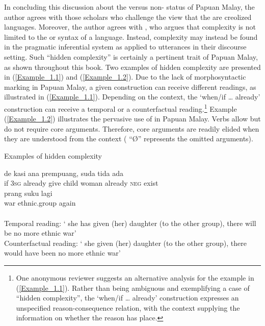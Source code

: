 In concluding this discussion about the  versus non- status of Papuan Malay, the author agrees with those scholars who challenge the view that the  are creolized languages. Moreover, the author agrees with \citet[35, 43]{Bisang.2009}, who argues that complexity is not limited to the  or syntax of a language. Instead, complexity may instead be found in the pragmatic inferential system as applied to utterances in their discourse setting. Such  ``hidden complexity'' is certainly a pertinent trait of Papuan Malay, as shown throughout this book. Two examples of hidden complexity are presented in (\ref{Example_1.1}) and (\ref{Example_1.2}). Due to the lack of morphosyntactic marking in Papuan Malay, a given construction can receive different readings, as illustrated in (\ref{Example_1.1}). Depending on the context, the  ‘when/if {\ldots} already’ construction can receive a temporal or a counterfactual reading.\footnote{One anonymous reviewer suggests an alternative analysis for the example in (\ref{Example_1.1}). Rather than being ambiguous and exemplifying a case of  ``hidden complexity'', the  `when/if {\ldots} already' construction expresses an unspecified reason-consequence relation, with the context supplying the information on whether the reason has place.} Example (\ref{Example_1.2}) illustrates the pervasive use of  in Papuan Malay. Verbs allow but do not require core arguments. Therefore, core arguments are readily elided when they are understood from the context ( ``Ø'' represents the omitted arguments).



\begin{styleExampleTitle}
{Examples of hidden complexity}
\end{styleExampleTitle}
\ea
\label{Example_1.1}
\gll {} de  kasi ana prempuang, suda tida ada\\ %
 if \textsc{3sg} already give child woman already \textsc{neg} exist\\
\gll prang suku lagi\\
war ethnic.group again\\
\glt {}\\
Temporal reading: ` she has given (her) daughter (to the other group), there will be no more ethnic war'\\
Counterfactual reading: ‘ she  given (her) daughter (to the other group), there would have been no more ethnic war’ \textstyleExampleSource{[081006-027-CvEx.0012]}
\z


